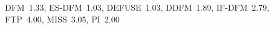 \textsc{DFM}~1.33, \textsc{ES{-}DFM}~1.03, \textsc{DEFUSE}~1.03, \textsc{DDFM}~1.89, \textsc{IF{-}DFM}~2.79, \textsc{FTP}~4.00, \textsc{MISS}~3.05, \textsc{PI}~2.00

